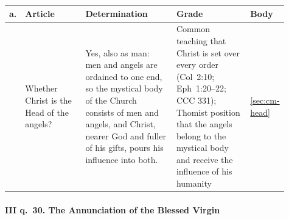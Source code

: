 \begingroup\footnotesize
\begin{longtable}{>{\raggedright\arraybackslash}p{0.03\linewidth}>{\raggedright\arraybackslash}p{0.22\linewidth}>{\raggedright\arraybackslash}p{0.33\linewidth}>{\raggedright\arraybackslash}p{0.27\linewidth}>{\raggedright\arraybackslash}p{0.06\linewidth}}
\toprule
\textbf{a.} & \textbf{Article} & \textbf{Determination} & \textbf{Grade} & \textbf{Body}\\
\midrule
\endhead
4 & Whether Christ is the Head of the angels? & Yes, also as man: men and angels are ordained to one end, so the mystical body of the Church consists of men and angels, and Christ, nearer God and fuller of his gifts, pours his influence into both. & Common teaching that Christ is set over every order (Col~2:10; Eph~1:20--22; CCC 331); Thomist position that the angels belong to the mystical body and receive the influence of his humanity & \ref{sec:cm-head}\\
\bottomrule
\end{longtable}
\endgroup

\paragraph{III q.~30. The Annunciation of the Blessed Virgin}

